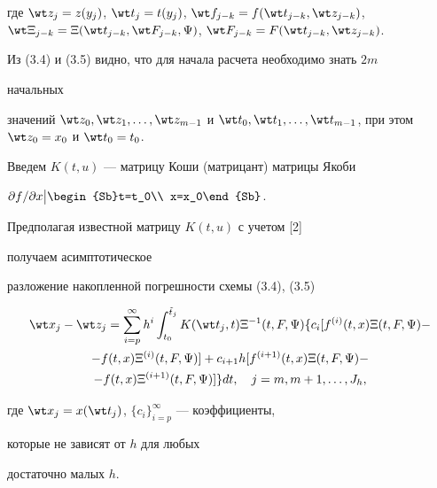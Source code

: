 где $\wt z_j=z(y_j)$, $\wt t_j=t(y_j)$, $\wt f_{j-k}=f(\wt t_{j-k},\wt 


z_{j-k})$, $\wt\Xi_{j-k}=\Xi(\wt t_{j-k},\wt F_{j-k},\Psi)$, $\wt 


F_{j-k}=F(\wt t_{j-k},\wt z_{j-k})$. 


 


 


Из (3.4) и (3.5) видно, что для начала расчета необходимо знать $2m$ 


начальных 


значений $\wt z_0,\wt z_1,\dotsc,\wt z_{m-1}$ и $\wt t_0,\wt 


t_1,\dotsc,\wt t_{m-1}$, при этом $\wt z_0=x_0$ и $\wt t_0=t_0$. 


 


Введем $K(t,u)$ --- матрицу Коши (матрицант) матрицы Якоби 


$\partial f/\partial x 


\big|\begin{Sb}t=t_0\\ x=x_0\end{Sb}$. 


Предполагая известной матрицу $K(t,u)$ с учетом [2] 


получаем асимптотическое 


разложение накопленной погрешности схемы (3.4), (3.5) 


\begin{multline} 


\wt x_j-\wt z_j=\sum^\infty_{i=p}h^i 


\int^{\Tilde t_j}_{t_0}K(\wt t_j,t)\Xi^{-1}(t,F,\Psi)\{c_i 


[f^{(i)}(t,x)\Xi(t,F,\Psi)- \\ 


% 


-f(t,x)\Xi^{(i)}(t,F,\Psi)]+c_{i+1}h[f^{(i+1)}(t,x)\Xi 


(t,F,\Psi)- \\


-f(t,x)\Xi^{(i+1)}(t,F,\Psi)]\}dt,\quad 


j=m,m+1,\dotsc,J_h, 


\end{multline} 


где $\wt x_j=x(\wt t_j)$, $\{c_i\}^\infty_{i=p}$ --- коэффициенты, 


которые не зависят от $h$ для любых 


достаточно малых $h$. 


